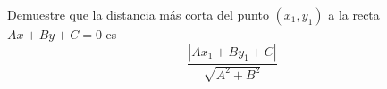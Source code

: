 \item Demuestre que la distancia más corta del punto $(x_1, y_1)$ a la recta $Ax + By + C = 0$ es $$\frac{|Ax_1 + By_1 + C|}{\sqrt{A^2 + B^2}}$$

